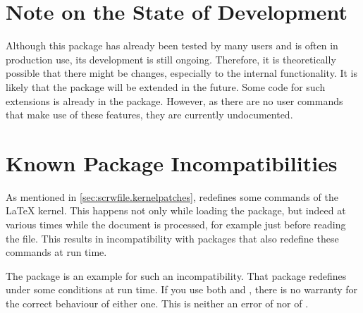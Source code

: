 \section{Note on the State of Development}

Although this package has already been tested by many users and is often in
production use, its development is still ongoing. Therefore, it is
theoretically possible that there might be changes, especially to the internal
functionality. It is likely that the package will be extended in the future.
Some code for such extensions is already in the package. However, as there are
no user commands that make use of these features, they are currently
undocumented.

\section{Known Package Incompatibilities}

As mentioned in \autoref{sec:scrwfile.kernelpatches}, 
redefines some commands of the \LaTeX{} kernel. This happens not only while
loading the package, but indeed at various times while the document is
processed, for example just before reading the  file.
This results in incompatibility with packages that also
redefine these commands at run time.

The 
package is an example for such an incompatibility. That package redefines
 under some conditions at run time. If you use both
 and , there is no warranty for the
correct behaviour of either one. This is neither an error of
 nor of .%
%
\EndIndexGroup

